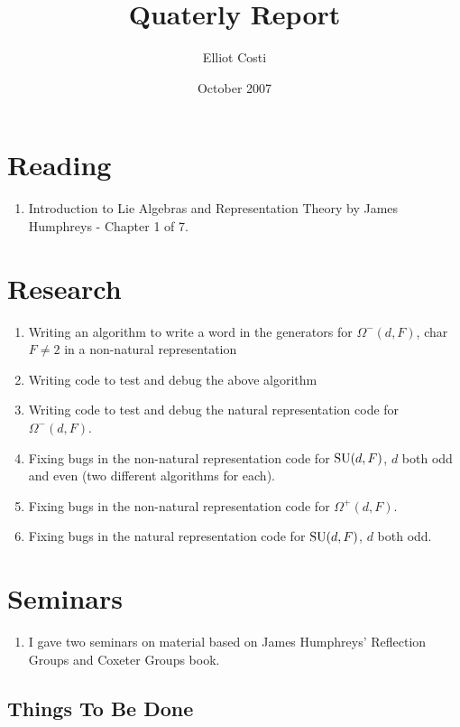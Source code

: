\documentclass[12pt]{article}
\def\SU{{\rm SU}}
\begin{document}
\title{Quaterly Report}
\author{Elliot Costi}
\date{October 2007}
\maketitle

\newpage

\section{Reading}

\begin{enumerate}
\item Introduction to Lie Algebras and Representation Theory by James Humphreys - Chapter 1 of 7.
\end{enumerate}

\section{Research}

\begin{enumerate}
\item Writing an algorithm to write a word in the generators for $\Omega^-(d, F)$, char $F \ne 2$ in a non-natural representation
\item Writing code to test and debug the above algorithm
\item Writing code to test and debug the natural representation code for $\Omega^-(d, F)$.
\item Fixing bugs in the non-natural representation code for $\SU(d, F)$, $d$ both odd and even (two different algorithms for each).
\item Fixing bugs in the non-natural representation code for $\Omega^+(d, F)$.
\item Fixing bugs in the natural representation code for $\SU(d, F)$, $d$ both odd.
\end{enumerate}

\section{Seminars}

\begin{enumerate}
\item I gave two seminars on material based on James Humphreys' Reflection Groups and Coxeter Groups book.
\end{enumerate}


\subsection{Things To Be Done}
\end{document}
